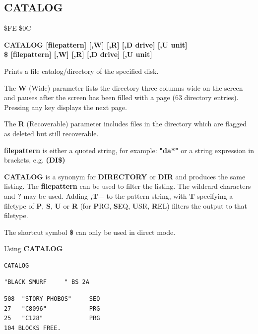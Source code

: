 \subsection{CATALOG}
\begin{description}[leftmargin=2cm,style=nextline]
\item [Token:]  \$FE \$0C
\item [Format:] {\bf CATALOG [filepattern] [,W] [,R] [,D drive] [,U unit] } \\
		{\bf \$ [filepattern] [,W] [,R] [,D drive] [,U unit] }
\item [Usage:]  Prints a file catalog/directory of the specified disk.

   The {\bf W} (Wide) parameter lists the directory three columns wide
   on the screen and pauses after the screen has been filled with a page
   (63 directory entries). Pressing any key displays the next page.

   The {\bf R} (Recoverable) parameter includes files in the
   directory which are flagged as deleted but still
   recoverable.

   {\bf filepattern} is either a quoted string, for example: {\bf "da*"} or
   a string expression in brackets, e.g. {\bf (DI\$)}

   \drivedefinition

   \unitdefinition

\item [Remarks:]
   {\bf CATALOG} is a synonym for {\bf DIRECTORY}
   or {\bf DIR} and produces the same listing.
   The {\bf filepattern} can be used to filter the listing.
   The wildcard characters {\bf *} and {\bf ?} may be used.
   Adding {\bf ,T=} to the pattern string, with {\bf T} specifying
   a filetype of {\bf P}, {\bf S}, {\bf U} or {\bf R}
   (for {\bf P}RG, {\bf S}EQ, {\bf U}SR, {\bf R}EL) filters the
   output to that filetype.

   The shortcut symbol {\bf \$} can only be used in direct mode.

\item [Examples:] Using {\bf CATALOG}

\begin{tcolorbox}[colback=black,coltext=white]
\verbatimfont{\codefont}
\begin{verbatim}
CATALOG
\end{verbatim}
\selectfont{\codefont 0}
\begin{tcolorbox}[colback=white,coltext=black,arc=0mm,boxrule=0mm,
       left*=0.5mm,right*=0mm,top=0mm,bottom=0mm,nobeforeafter,
       left skip=0.5mm,
       width=28mm,height=3mm,valign=center]
\begin{verbatim}
"BLACK SMURF     " BS 2A
\end{verbatim}
\end{tcolorbox}
\begin{verbatim}
508  "STORY PHOBOS"     SEQ
27   "C8096"            PRG
25   "C128"             PRG
104 BLOCKS FREE.
\end{verbatim}
\end{tcolorbox}


\end{description}
